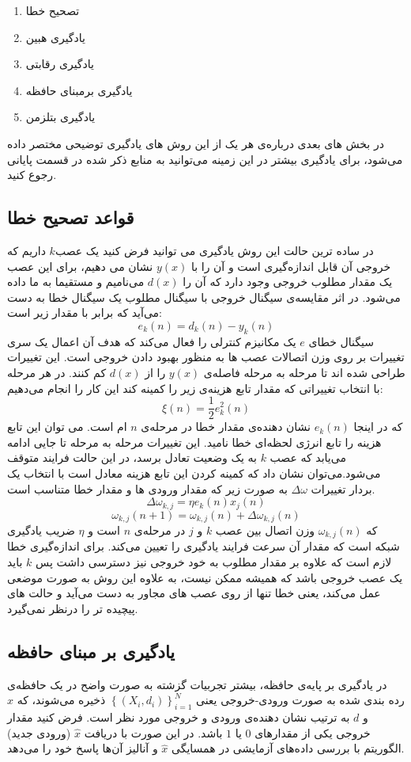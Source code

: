 \documentclass[11pt,a4paper,twocolumn]{article}
\begin{document}
\begin{enumerate}
\item
تصحیح خطا
\item
یادگیری هبین
\item
یادگیری رقابتی
\item
یادگیری برمبنای حافظه
\item
یادگیری بتلزمن
\end{enumerate}
در بخش های بعدی درباره‌ی هر یک از این روش های یادگیری توضیحی مختصر داده می‌شود، برای یادگیری بیشتر در این زمینه می‌توانید به منابع ذکر شده در قسمت پایانی رجوع کنید.

\subsection{قواعد تصحیح خطا}
در ساده ترین حالت این روش یادگیری می ‌توانید فرض کنید یک عصب$k$  داریم که خروجی آن قابل اندازه‌گیری است و آن را با $y(x)$ نشان می دهیم، برای این عصب یک مقدار مطلوب خروجی وجود دارد که آن را $d(x)$ می‌نامیم و مستقیما به ما داده می‌شود. در اثر مقایسه‌ی سیگنال خروجی با سیگنال مطلوب یک سیگنال خطا به دست می‌آید که برابر با مقدار زیر است:
$$e_k(n) = d_k(n) - y_k(n)$$
سیگنال خطای $e$ یک مکانیزم کنترلی را فعال می‌کند که هدف آن اعمال یک سری تغییرات بر روی وزن اتصالات عصب ها به منظور بهبود دادن خروجی است. این تغییرات طراحی شده اند تا مرحله به مرحله فاصله‌ی $y(x)$ را از $d(x)$ کم کنند. در هر مرحله با انتخاب تغییراتی که مقدار تابع هزینه‌ی زیر را کمینه کند این کار را انجام می‌دهیم:
$$\xi(n) = \frac{1}{2}e_k^2(n)$$
که در اینجا $e_k(n)$ نشان دهنده‌ی مقدار خطا در مرحله‌ی $n$ ام است.  می توان این تابع هزینه را تابع انرژی لحظه‌ای خطا نامید. این تغییرات مرحله به مرحله تا جایی ادامه می‌یابد که عصب $k$ به یک وضعیت تعادل برسد، در این حالت فرایند متوقف می‌شود.می‌توان نشان داد که کمینه کردن این تابع هزینه معادل است با انتخاب یک بردار تغییرات
$\Delta \omega$
به صورت زیر که  مقدار ورودی ها و مقدار خطا متناسب است.
$$\Delta \omega_{k,j} = \eta e_k(n)x_j(n)$$
$$\omega_{k,j}(n+1) = \omega_{k,j}(n) + \Delta \omega_{k,j}(n)$$
که $\omega_{k,j}(n)$ وزن اتصال بین عصب $k$ و $j$  در مرحله‌ی $n$ است و $\eta$ ضریب یادگیری شبکه است که مقدار آن سرعت فرایند یادگیری را تعیین می‌کند.
برای اندازه‌گیری خطا لازم است که علاوه بر مقدار مطلوب به خود خروجی نیز دسترسی داشت پس $k$ باید یک عصب خروجی باشد که همیشه ممکن نیست، به علاوه این روش به صورت موضعی عمل می‌کند، یعنی خطا تنها از روی عصب های مجاور به دست می‌آید و حالت های پیچیده تر را درنظر نمی‌گیرد.
\subsection{یادگیری بر مبنای حافظه}
در یادگیری بر پایه‌ی حافظه، بیشتر تجربیات گزشته به صورت واضح در یک حافظه‌ی رده بندی شده به صورت ورودی-خروجی یعنی
$\left\{ (X_i, d_i) \right\}_{i=1}^N$
ذخیره می‌شوند، که $x$ و $d$ به ترتیب نشان دهنده‌ی ورودی و خروجی مورد نظر است. فرض کنید مقدار خروجی یکی از مقدار‌های $0$ یا $1$ باشد. در این صورت با دریافت
$\widehat x$
(ورودی جدید) الگوریتم با بررسی داده‌های آزمایشی در همسایگی
$\widehat x$
و  آنالیز آن‌ها پاسخ خود را می‌دهد.
\end{document}
